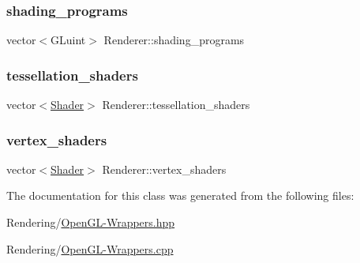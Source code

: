 \subsubsection{\texorpdfstring{shading\+\_\+programs}{shading\_programs}}
{\footnotesize\ttfamily vector$<$G\+Luint$>$ Renderer\+::shading\+\_\+programs\hspace{0.3cm}{\ttfamily [private]}}

\mbox{\label{classRenderer_a6d0795a107f8fd1b3ca9af990e5a0928}} 
\subsubsection{\texorpdfstring{tessellation\+\_\+shaders}{tessellation\_shaders}}
{\footnotesize\ttfamily vector$<$\mbox{\hyperlink{classShader}{Shader}}$>$ Renderer\+::tessellation\+\_\+shaders\hspace{0.3cm}{\ttfamily [private]}}

\mbox{\label{classRenderer_a5b8247d261a919a58711df232bf272c5}} 
\subsubsection{\texorpdfstring{vertex\+\_\+shaders}{vertex\_shaders}}
{\footnotesize\ttfamily vector$<$\mbox{\hyperlink{classShader}{Shader}}$>$ Renderer\+::vertex\+\_\+shaders\hspace{0.3cm}{\ttfamily [private]}}



The documentation for this class was generated from the following files\+:\begin{DoxyCompactItemize}
\item 
Rendering/\mbox{\hyperlink{OpenGL-Wrappers_8hpp}{Open\+G\+L-\/\+Wrappers.\+hpp}}\item 
Rendering/\mbox{\hyperlink{OpenGL-Wrappers_8cpp}{Open\+G\+L-\/\+Wrappers.\+cpp}}\end{DoxyCompactItemize}
